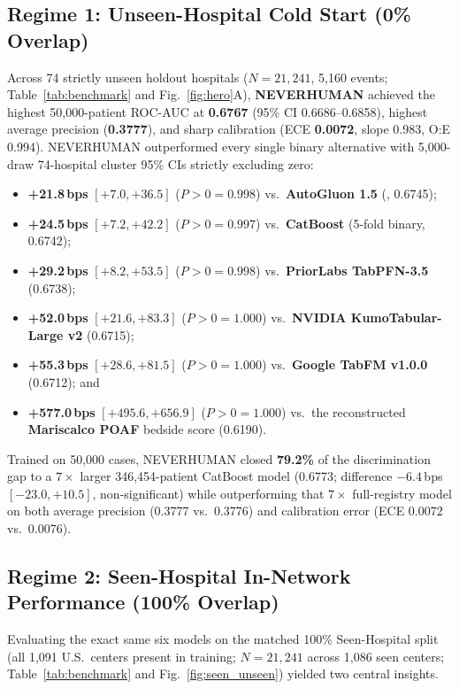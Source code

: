 \subsection{Regime 1: Unseen-Hospital Cold Start (0\% Overlap)}
Across 74 strictly unseen holdout hospitals ($N{=}21{,}241$, 5,160 events; Table~\ref{tab:benchmark} and Fig.~\ref{fig:hero}A), \textbf{NEVERHUMAN} achieved the highest 50,000-patient ROC-AUC at \textbf{0.6767} (95\% CI 0.6686--0.6858), highest average precision (\textbf{0.3777}), and sharp calibration (ECE \textbf{0.0072}, slope 0.983, O:E 0.994). NEVERHUMAN outperformed every single binary alternative with 5,000-draw 74-hospital cluster 95\% CIs strictly excluding zero:
\begin{itemize}
  \item \textbf{+21.8\,bps} $[+7.0, +36.5]$ ($P{>}0 = 0.998$) vs.\ \textbf{AutoGluon 1.5} (, 0.6745);
  \item \textbf{+24.5\,bps} $[+7.2, +42.2]$ ($P{>}0 = 0.997$) vs.\ \textbf{CatBoost} (5-fold binary, 0.6742);
  \item \textbf{+29.2\,bps} $[+8.2, +53.5]$ ($P{>}0 = 0.998$) vs.\ \textbf{PriorLabs TabPFN-3.5} (0.6738);
  \item \textbf{+52.0\,bps} $[+21.6, +83.3]$ ($P{>}0 = 1.000$) vs.\ \textbf{NVIDIA KumoTabular-Large v2} (0.6715);
  \item \textbf{+55.3\,bps} $[+28.6, +81.5]$ ($P{>}0 = 1.000$) vs.\ \textbf{Google TabFM v1.0.0} (0.6712); and
  \item \textbf{+577.0\,bps} $[+495.6, +656.9]$ ($P{>}0 = 1.000$) vs.\ the reconstructed \textbf{Mariscalco POAF} bedside score (0.6190).
\end{itemize}
Trained on 50,000 cases, NEVERHUMAN closed \textbf{79.2\%} of the discrimination gap to a $7\times$ larger 346,454-patient CatBoost model (0.6773; difference $-6.4$\,bps $[-23.0, +10.5]$, non-significant) while outperforming that $7\times$ full-registry model on both average precision (0.3777 vs.\ 0.3776) and calibration error (ECE 0.0072 vs.\ 0.0076).



\subsection{Regime 2: Seen-Hospital In-Network Performance (100\% Overlap)}
Evaluating the exact same six models on the matched 100\% Seen-Hospital split (all 1,091 U.S.\ centers present in training; $N{=}21{,}241$ across 1,086 seen centers; Table~\ref{tab:benchmark} and Fig.~\ref{fig:seen_unseen}) yielded two central insights.

